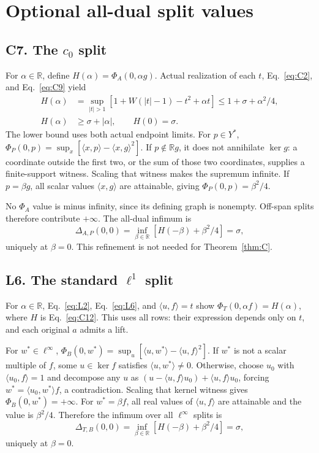 \documentclass[11pt]{article}
\newcommand{\R}{\mathbb R}
\newcommand{\pair}[2]{\langle #1,#2\rangle}
\begin{document}
\appendix
\section{Optional all-dual split values}
\label{sec:split}
\subsection{C7. The $c_0$ split}
\label{sec:C7}
For $\alpha\in\R$, define $H(\alpha)=\Phi_A(0,\alpha g)$.
Actual realization of each $t$, Eq.~\eqref{eq:C2}, and
Eq.~\eqref{eq:C9} yield
\begin{equation}
\begin{aligned}
H(\alpha)&=\sup_{|t|>1}[1+W(|t|-1)-t^2+\alpha t]
 \le1+\sigma+\alpha^2/4,\\
H(\alpha)&\ge\sigma+|\alpha|,\qquad H(0)=\sigma.
\end{aligned}
\tag{C12}\label{eq:C12}
\end{equation}
The lower bound uses both actual endpoint limits. For $p\in Y^*$,
$\Phi_P(0,p)=\sup_x[\pair{x}{p}-\pair{x}{g}^2]$.
If $p\notin\R g$, it does not annihilate $\ker g$: a coordinate outside
the first two, or the sum of those two coordinates, supplies a
finite-support witness. Scaling that witness makes the supremum infinite.
If $p=\beta g$, all scalar values $\pair{x}{g}$ are attainable, giving
$\Phi_P(0,p)=\beta^2/4$.

No $\Phi_A$ value is minus infinity, since its defining graph is nonempty.
Off-span splits therefore contribute $+\infty$. The all-dual infimum is
\[
\Delta_{A,P}(0,0)=\inf_{\beta\in\R}[H(-\beta)+\beta^2/4]=\sigma,
\]
uniquely at $\beta=0$. This refinement is not needed for
Theorem~\ref{thm:C}.

\subsection{L6. The standard $\ell^1$ split}
\label{sec:L6}
For $\alpha\in\R$, Eq.~\eqref{eq:L2}, Eq.~\eqref{eq:L6}, and
$\pair{u}{f}=t$ show $\Phi_T(0,\alpha f)=H(\alpha)$, where $H$ is
Eq.~\eqref{eq:C12}. This uses all rows: their expression depends only on
$t$, and each original $a$ admits a lift.

For $w^*\in\ell^\infty$,
$\Phi_B(0,w^*)=\sup_u[\pair{u}{w^*}-\pair{u}{f}^2]$.
If $w^*$ is not a scalar multiple of $f$, some $u\in\ker f$ satisfies
$\pair{u}{w^*}\ne0$. Otherwise, choose $u_0$ with $\pair{u_0}{f}=1$ and
decompose any $u$ as $(u-\pair{u}{f}u_0)+\pair{u}{f}u_0$, forcing
$w^*=\pair{u_0}{w^*}f$, a contradiction.
Scaling that kernel witness gives $\Phi_B(0,w^*)=+\infty$.
For $w^*=\beta f$, all real values of $\pair{u}{f}$ are attainable and
the value is $\beta^2/4$. Therefore the infimum over all $\ell^\infty$
splits is
\[
\Delta_{T,B}(0,0)=\inf_{\beta\in\R}[H(-\beta)+\beta^2/4]=\sigma,
\]
uniquely at $\beta=0$.
\end{document}
